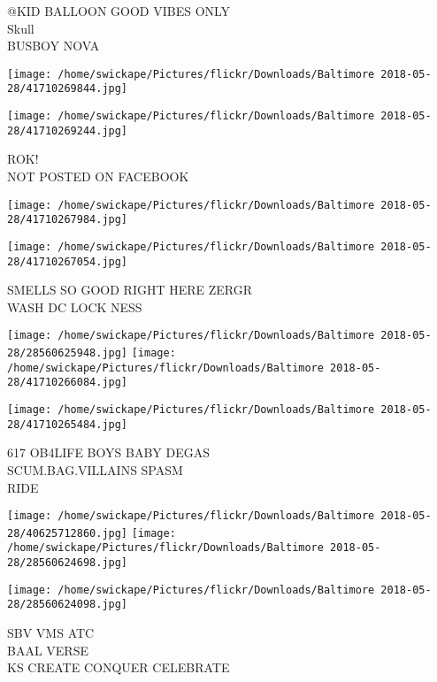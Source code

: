\documentclass[10pt,letterpaper]{article}
\begin{document}
@KID BALLOON GOOD VIBES ONLY\\
Skull\\
BUSBOY NOVA\\
\pagebreak

\texttt{[image: /home/swickape/Pictures/flickr/Downloads/Baltimore 2018-05-28/41710269844.jpg]}

\vspace{0.25in}
\texttt{[image: /home/swickape/Pictures/flickr/Downloads/Baltimore 2018-05-28/41710269244.jpg]}

ROK!\\
NOT POSTED ON FACEBOOK\\
\pagebreak

\texttt{[image: /home/swickape/Pictures/flickr/Downloads/Baltimore 2018-05-28/41710267984.jpg]}

\vspace{0.25in}
\texttt{[image: /home/swickape/Pictures/flickr/Downloads/Baltimore 2018-05-28/41710267054.jpg]}

SMELLS SO GOOD RIGHT HERE ZERGR\\
WASH DC LOCK NESS\\
\pagebreak

\texttt{[image: /home/swickape/Pictures/flickr/Downloads/Baltimore 2018-05-28/28560625948.jpg]}
\texttt{[image: /home/swickape/Pictures/flickr/Downloads/Baltimore 2018-05-28/41710266084.jpg]}

\vspace{0.25in}
\texttt{[image: /home/swickape/Pictures/flickr/Downloads/Baltimore 2018-05-28/41710265484.jpg]}

617 OB4LIFE BOYS BABY DEGAS\\
SCUM.BAG.VILLAINS SPASM\\
RIDE\\
\pagebreak

\texttt{[image: /home/swickape/Pictures/flickr/Downloads/Baltimore 2018-05-28/40625712860.jpg]}
\texttt{[image: /home/swickape/Pictures/flickr/Downloads/Baltimore 2018-05-28/28560624698.jpg]}

\texttt{[image: /home/swickape/Pictures/flickr/Downloads/Baltimore 2018-05-28/28560624098.jpg]}

SBV VMS ATC\\
BAAL VERSE\\
KS CREATE CONQUER CELEBRATE\\
\pagebreak
\end{document}
